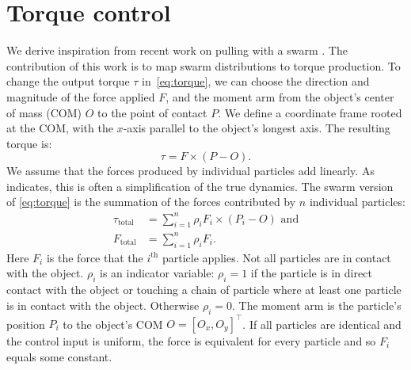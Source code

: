 \section{Torque control}
\label{sec:theory}

We derive inspiration from recent work on pulling with a swarm \cite{pulltogether}. The contribution of this work is to map swarm distributions to torque production.
To change the output torque $\tau$ in~\eqref{eq:torque}, we can choose the direction and magnitude of the force applied $F$, and the moment arm from the object's center of mass (COM) $O$ to the point of contact $P$.
We define a coordinate frame rooted at the COM, with the $x$-axis parallel to the object's longest axis. The resulting torque is:
%
\begin{equation}
\tau = F \times (P - O ).\label{eq:torque}
\end{equation}
%
We assume that the forces produced by individual particles add linearly. 
 As \cite{pulltogether} indicates, this is often a simplification of the true dynamics. 
 The swarm version of \eqref{eq:torque} is the summation of the forces contributed by $n$ individual particles:
\begin{align}
\tau_{\text{total}} &= \sum\limits_{i=1}^n \rho_i F_i \times (P_i - O ) \textrm{      and}   \label{eq:swarmtorque}\\
F_{\text{total}} &= \sum\limits_{i=1}^n \rho_i F_i.  \label{eq:swarmforce}
\end{align}
Here $F_i$ is the force that the $i^{\textrm{th}}$ particle applies. 
Not all particles are in contact with the object.  
$\rho_i$ is an indicator variable: $\rho_i=1$ if the particle is in direct contact with the object or touching a chain of particle where at least one particle is in contact with the object. 
 Otherwise $\rho_i = 0$.
The moment arm is the particle's position $P_i$ to the object's COM $O=[O_x,O_y]^{\top}$. 
 If all particles are identical and the control input is uniform, the force is equivalent for every particle and so $F_i $ equals some constant.
%
